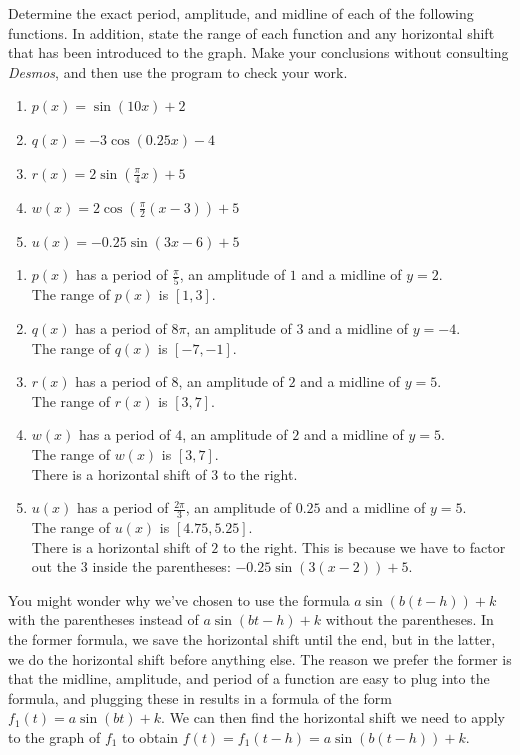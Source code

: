 \documentclass{ximera}
\begin{document}
\begin{example}
Determine the exact period, amplitude, and midline of each of the following functions.  In addition,  state the range of each function and any horizontal shift that has been introduced to the graph.  Make your conclusions without consulting \emph{Desmos}, and then use the program to check your work.%

\begin{enumerate}[label=\alph*.]
\item
\(p(x) = \sin(10x) + 2\)%
\item
\(q(x) = -3\cos(0.25x) - 4\)%
\item
\(r(x) = 2\sin\left( \frac{\pi}{4} x\right) + 5\)%
\item
\(w(x) = 2\cos\left( \frac{\pi}{2} (x-3) \right) + 5\)%
\item
\(u(x) = -0.25\sin\left(3x-6\right) + 5\)%
\end{enumerate}
\begin{explanation}
\begin{enumerate}[label=\alph*.]
\item
$p(x)$ has a period of $\frac{\pi}{5}$, an amplitude of $1$ and a midline of $y=2$. \\
The range of $p(x)$ is $[1,3]$.
\item
$q(x)$ has a period of $8\pi$, an amplitude of $3$ and a midline of $y=-4$. \\
The range of $q(x)$ is $[-7, -1]$.
\item
$r(x)$ has a period of $8$, an amplitude of $2$ and a midline of $y=5$. \\
 The range of $r(x)$ is $[3, 7]$.
\item
$w(x)$ has a period of $4$, an amplitude of $2$ and a midline of $y=5$.\\
The range of $w(x)$ is $[3, 7]$. \\
There is a horizontal shift of $3$ to the right.
\item
$u(x)$ has a period of $\frac{2\pi}{3}$, an amplitude of $0.25$ and a midline of $y=5$. \\
The range of $u(x)$ is $[4.75, 5.25]$. \\
There is a horizontal shift of $2$ to the right. This is because we have to factor out the 3 inside the parentheses: $-0.25\sin(3(x - 2)) + 5$. 
\end{enumerate}
\end{explanation}
\end{example}

You might wonder why we've chosen to use the formula $a\sin(b(t-h)) + k$ with the parentheses instead of $a\sin(bt - h) + k$ without the parentheses. In the former formula, we save the horizontal shift until the end, but in the latter, we do the horizontal shift before anything else. The reason we prefer the former is that the midline, amplitude, and period of a function are easy to plug into the formula, and plugging these in results in a formula of the form $f_1(t) = a\sin(bt) + k$. We can then find the horizontal shift we need to apply to the graph of $f_1$ to obtain $f(t) = f_1(t - h) = a\sin(b(t - h)) + k$. 
\end{document}
